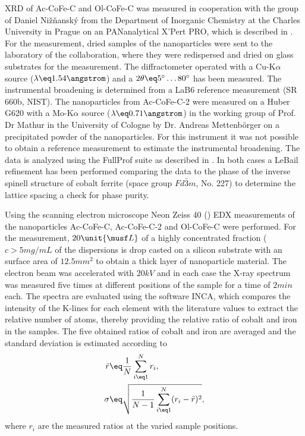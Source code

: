 \documentclass[\main/dresen_thesis.tex]{subfiles}
\begin{document}
    XRD of Ac-CoFe-C and Ol-CoFe-C was measured in cooperation with the group of Daniel Nižňanský from the Department of Inorganic Chemistry at the Charles University in Prague on an PANanalytical X'Pert PRO, which is described in .
    For the measurement, dried samples of the nanoparticles were sent to the laboratory of the collaboration, where they were redispersed and dried on glass substrates for the measurement.
    The diffractometer operated with a Cu-K$\alpha$ source ($\lambda \eq 1.54 \angstrom$) and a $2 \theta \eq 5^\circ \ldots 80^\circ$ has been measured.
    The instrumental broadening is determined from a LaB6 reference measurement (SR 660b, NIST).
    The nanoparticles from Ac-CoFe-C-2 were measured on a Huber G620 with a Mo-K$\alpha$ source ($\lambda \eq 0.71 \angstrom$) in the working group of Prof. Dr Mathur in the University of Cologne by Dr. Andreas Mettenb\"orger on a precipitated powder of the nanoparticles.
    For this instrument it was not possible to obtain a reference measurement to estimate the instrumental broadening.
    The data is analyzed using the FullProf suite \cite{Rodriguez_1993_Recen} as described in .
    In both cases a LeBail refinement has been performed comparing the data to the phase of the inverse spinell structure of cobalt ferrite (space group $Fd\bar{3}m$, No. 227) to determine the lattice spacing a check for phase purity.

    Using the scanning electron microscope Neon Zeiss 40 () EDX measurements of the nanoparticles Ac-CoFe-C, Ac-CoFe-C-2 and Ol-CoFe-C were performed.
    For the measurement, $20 \unit{\musf L}$ of a highly concentrated fraction ($c > 5 \unit{mg/mL}$ of the dispersions is drop casted on a silicon substrate with an surface area of $12.5 \unit{mm^2}$ to obtain a thick layer of nanoparticle material.
    The electron beam was accelerated with $20 \unit{kV}$ and in each case the X-ray spectrum was measured five times at different positions of the sample for a time of $2 \unit{min}$ each.
    The spectra are evaluated using the software INCA, which compares the intensity of the K-lines for each element with the literature values to extract the relative number of atoms, thereby providing the relative ratio of cobalt and iron in the samples.
    The five obtained ratios of cobalt and iron are averaged and the standard deviation is estimated according to
    \begin{align}
      \bar{r} &\eq \frac{1}{N} \sum_{i \eq 1}^N r_i,\\
      \sigma &\eq \sqrt{\frac{1}{N-1} \sum_{i \eq 1}^N (r_i - \bar{r})^2},
    \end{align}
    where $r_i$ are the measured ratios at the varied sample positions.
\end{document}
